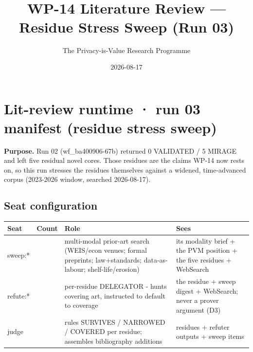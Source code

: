 \documentclass[
  11pt,
]{article}
\title{WP-14 Literature Review --- Residue Stress Sweep (Run 03)}
\author{The Privacy-is-Value Research Programme}
\date{2026-08-17}
\newcounter{none} %
\begin{document}
\maketitle

\section{Lit-review runtime · run 03 manifest (residue stress
sweep)}\label{lit-review-runtime-run-03-manifest-residue-stress-sweep}

\textbf{Purpose.} Run 02 (wf\_ba400906-67b) returned 0 VALIDATED / 5
MIRAGE and left five residual novel cores. Those residues are the claims
WP-14 now rests on, so this run stresses the residues themselves against
a widened, time-advanced corpus (2023-2026 window, searched 2026-08-17).

\subsection{Seat configuration}\label{seat-configuration}

{\def\LTcaptype{none} %
\begin{longtable}[]{@{}
  >{\raggedright\arraybackslash}p{}
  >{\raggedright\arraybackslash}p{}
  >{\raggedright\arraybackslash}p{}
  >{\raggedright\arraybackslash}p{}@{}}
\toprule\noalign{}
\begin{minipage}[b]{\linewidth}\raggedright
Seat
\end{minipage} & \begin{minipage}[b]{\linewidth}\raggedright
Count
\end{minipage} & \begin{minipage}[b]{\linewidth}\raggedright
Role
\end{minipage} & \begin{minipage}[b]{\linewidth}\raggedright
Sees
\end{minipage} \\
\midrule\noalign{}
\endhead
\bottomrule\noalign{}
\endlastfoot
sweep:* & 5 & multi-modal prior-art search (WEIS/econ venues; formal
preprints; law+standards; data-as-labour; shelf-life/erosion) & its
modality brief + the PVM position + the five residues + WebSearch \\
refute:* & 5 & per-residue DELEGATOR - hunts covering art, instructed to
default to coverage & the residue + sweep digest + WebSearch; never a
prover argument (D3) \\
judge & 1 & rules SURVIVES / NARROWED / COVERED per residue; assembles
bibliography additions & residues + refuter outputs + sweep items \\
\end{longtable}
}
\end{document}
